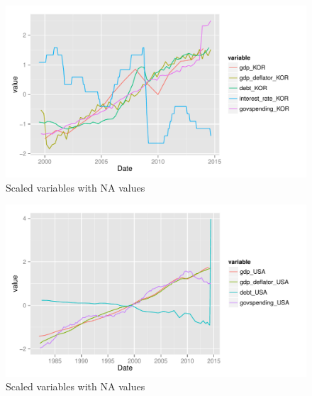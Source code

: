 \documentclass[12pt]{article}
\begin{document}
\begin{figure}
  \centering
    \includegraphics{na_plot_KOR.pdf}
  \caption{Scaled variables with NA values}
  \label{fig:na_plot_KOR}
\end{figure}

\begin{figure}
  \centering
    \includegraphics{na_plot_USA.pdf}
  \caption{Scaled variables with NA values}
  \label{fig:na_plot_USA}
\end{figure}
\end{document}
